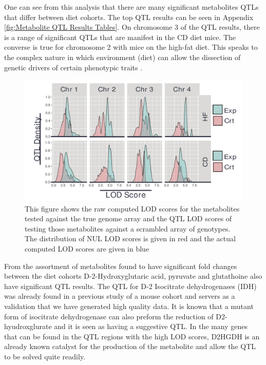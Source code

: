 \documentclass[a4paper,11pt,twoside]{book}
\begin{document}
    One can see from this analysis that there are many significant metabolites QTLs that differ between diet cohorts. The top QTL results can be seen in Appendix \ref{fig:Metabolite QTL Results Tables}. On chromosome 3 of the QTL results, there is a range of significant QTLs that are manifest in the CD diet mice. The converse is true for chromosome 2 with mice on the high-fat diet. This speaks to the complex nature in which environment (diet) can allow the dissection of genetic drivers of certain phenotypic traits \citep{Abiola2003identification}.
	
	\begin{figure}
		\includegraphics[width=1.2\linewidth]{QTL_Results/QTL_Densities.pdf}
		\caption{This figure shows the raw computed LOD scores for the metabolites tested against the true genome array and the QTL LOD scores of testing those metabolites against a scrambled array of genotypes. The distribution of NUL LOD scores is given in red and the actual computed LOD scores are given in blue }
	\label{fig: Distributions of QTL LOD scores for all significant Age and Diet related Metabolites}	
\end{figure}
	
	From the assortment of metabolites found to have significant fold changes between the diet cohorts D-2-Hydroxyglutaric acid, pyruvate and glutathoine also have significant QTL results. The QTL for D-2 Isocitrate dehydrogenases (IDH) was already found in a previous study of a mouse cohort and servers as a validation that we have generated high quality data.  It is known that a mutant form of isocitrate dehydrogenase can also preform the reduction of D2-hyudroxglurate and it is seen as having a suggestive QTL. In the many genes that can be found in the QTL regions with the high LOD scores, D2HGDH is an already known catalyst for the production of the metabolite and allow the QTL to be solved quite readily.
	
\end{document}
